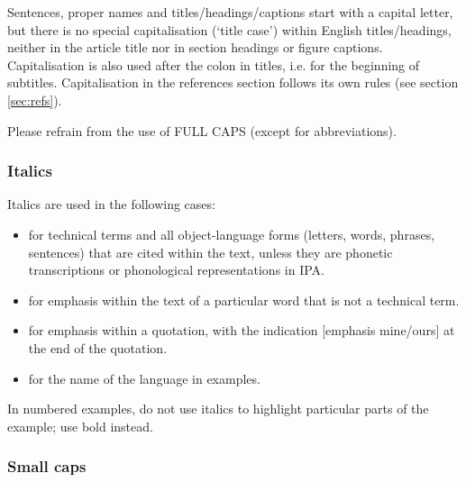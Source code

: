 \documentclass[charis,linguex,biblatex]{glossa}
\begin{document}
Sentences, proper names and titles/headings/captions start with a capital letter, but there is no special capitalisation (`title case') within English titles/headings, neither in the article title nor in section headings or figure captions. Capitalisation is also used after the colon in titles, i.e. for the beginning of subtitles. Capitalisation in the references section follows its own rules (see section \ref{sec:refs}).


Please refrain from the use of FULL CAPS (except for abbreviations).

\subsubsection{Italics}
Italics are used in the following cases:
\sloppy
\begin{itemize}
\item for technical terms and all object-language forms (letters, words, phrases, sentences) that are cited within the text, unless they are phonetic transcriptions or phonological representations in IPA.
\item for emphasis within the text of a particular word that is not a technical term.
\item for emphasis within a quotation, with the indication [emphasis mine/ours] at the end of the quotation.
\item for the name of the language in examples.
\end{itemize}

In numbered examples, do not use italics to highlight particular parts of the example; use bold instead.

\fussy

\subsubsection{Small caps} 
\end{document}

